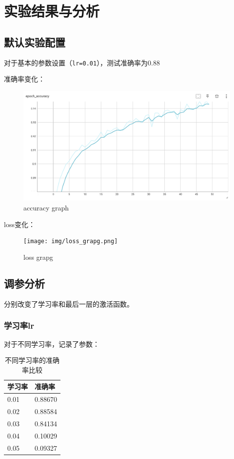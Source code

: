 \documentclass[12pt,a4paper]{article}
\begin{document}
\section{实验结果与分析}

\subsection{默认实验配置}

对于基本的参数设置（\texttt{lr=0.01}），测试准确率为0.88

准确率变化：

\begin{figure}[htbp]
    \centering
    \includegraphics[width=0.6\linewidth]{img/accuracy_graph.png}
    \caption{accuracy graph}
\end{figure} 

loss变化：

\begin{figure}[htbp]
    \centering
    \texttt{[image: img/loss\_grapg.png]}
    \caption{loss grapg}
\end{figure} 

\subsection{调参分析}

分别改变了学习率和最后一层的激活函数。

\subsubsection{学习率lr}

对于不同学习率，记录了参数：

\begin{table}[htbp]
    \centering
    \caption{不同学习率的准确率比较}
    \begin{tabular}{ll}
        \toprule
        学习率 & 准确率 \\
        \midrule
        0.01 & 0.88670 \\
        0.02 & 0.88584 \\
        0.03 & 0.84134 \\
        0.04 & 0.10029 \\
        0.05 & 0.09327 \\
        \bottomrule
    \end{tabular}
\end{table}
\end{document}
